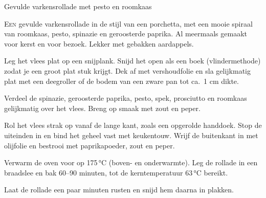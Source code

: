 \begin{recipe}{Gevulde varkensrollade met pesto en roomkaas}


\lettrine{E}{en} gevulde varkensrollade in de stijl van een porchetta, met een
mooie spiraal van roomkaas, pesto, spinazie en geroosterde paprika. Al meermaals
gemaakt voor kerst en voor bezoek. Lekker met gebakken aardappels.

\begin{ingredients}
\end{ingredients}

\begin{steps}
  \item Leg het vlees plat op een snijplank. Snijd het open als een boek
        (vlindermethode) zodat je een groot plat stuk krijgt. Dek af met
        vershoudfolie en sla gelijkmatig plat met een deegroller of de bodem
        van een zware pan tot ca.\ 1 cm dikte.
  \item Verdeel de spinazie, geroosterde paprika, pesto, spek, prosciutto en
        roomkaas gelijkmatig over het vlees. Breng op smaak met zout en peper.
  \item Rol het vlees strak op vanaf de lange kant, zoals een opgerolde handdoek.
        Stop de uiteinden in en bind het geheel vast met keukentouw. Wrijf de
        buitenkant in met olijfolie en bestrooi met paprikapoeder, zout en peper.
  \item Verwarm de oven voor op 175\,°C (boven- en onderwarmte). Leg de rollade in een braadslee en bak
        60--90 minuten, tot de kerntemperatuur 63\,°C bereikt.
  \item Laat de rollade een paar minuten rusten en snijd hem daarna in plakken.
\end{steps}
\end{recipe}
